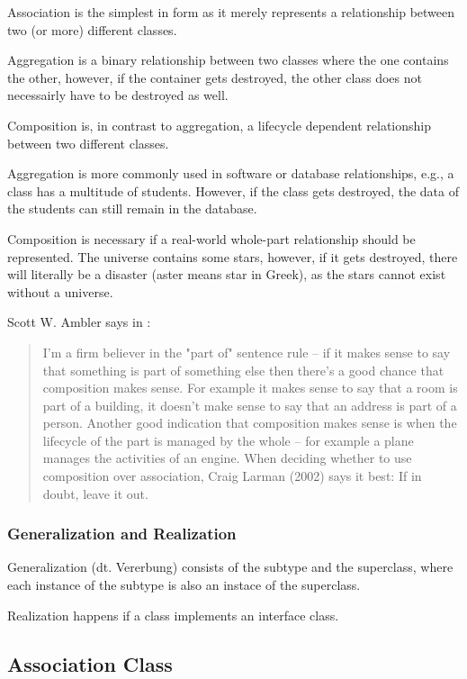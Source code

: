 \documentclass[../main/main.tex]{subfiles}
\begin{document}
Association is the simplest in form as it merely represents a relationship
between two (or more) different classes. 

Aggregation is a binary relationship between two classes where the one contains
the other, however, if the container gets destroyed, the other class does not
necessairly have to be destroyed as well. 

Composition is, in contrast to aggregation, a lifecycle dependent relationship
between two different classes. 

Aggregation is more commonly used in software or database relationships, e.g.,
a class has a multitude of students. However, if the class gets destroyed, the
data of the students can still remain in the database. 

Composition is necessary if a real-world whole-part relationship should be
represented. The universe contains some stars, however, if it gets destroyed,
there will literally be a disaster (aster means star in Greek), as the stars
cannot exist without a universe. 

Scott W. Ambler says in \cite{ambler:composition}:

\begin{quote} 
  I'm a firm believer in the "part of" sentence rule -- if it makes
  sense to say that something is part of something else then there's a good
  chance that composition makes sense. For example it makes sense to say that a
  room is part of a building, it doesn't make sense to say that an address is
  part of a person. Another good indication that composition makes sense is when
  the lifecycle of the part is managed by the whole -- for example a plane
  manages the activities of an engine. When deciding whether to use composition
  over association, Craig Larman (2002) says it best: If in doubt, leave it out.
\end{quote}

\subsubsection{Generalization and Realization}

Generalization (dt. Vererbung) consists of the subtype and the superclass, where
each instance of the subtype is also an instace of the superclass. 

Realization happens if a class implements an interface class. 

\subsection{Association Class}
\end{document}
